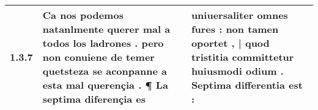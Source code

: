 \begin{tabular}{|p{1cm}|p{6.5cm}|p{6.5cm}|}

\hline
1.3.7 & Ca nos podemos natanlmente querer mal a todos los ladrones . \textbf{ pero non conuiene de temer quetsteza se aconpanne a esta mal querençia . } ¶ La septima diferençia es & uniuersaliter omnes fures : \textbf{ non tamen oportet , | quod tristitia committetur huiusmodi odium . } Septima differentia est : \\\hline

\end{tabular}
